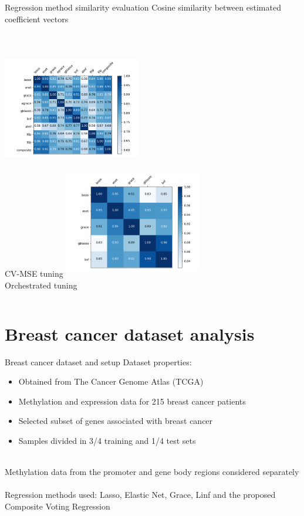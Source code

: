 \documentclass{beamer}
\begin{document}
\begin{frame}{Regression method similarity evaluation}
Cosine similarity between estimated coefficient vectors\\~\\
\begin{columns}[t]
	\centering
	\includegraphics[width=6cm,height=5cm]{cv_mse_similarities}\\
	CV-MSE tuning
	\centering
	\includegraphics[width=6cm,height=5cm]{orchestrated_similarities}\\
	Orchestrated tuning
\end{columns}
\end{frame}





\section{Breast cancer dataset analysis}
\begin{frame}{Breast cancer dataset and setup}
Dataset properties:
\begin{itemize}
	\item Obtained from The Cancer Genome Atlas (TCGA)
	\item Methylation and expression data for 215 breast cancer patients
	\item Selected subset of genes associated with breast cancer
	\item Samples divided in 3/4 training and 1/4 test sets
\end{itemize}
~\\
Methylation data from the promoter and gene body regions considered separately
\\~\\
Regression methods used: Lasso, Elastic Net, Grace, Linf and the proposed Composite Voting Regression
\end{frame}
\end{document}
